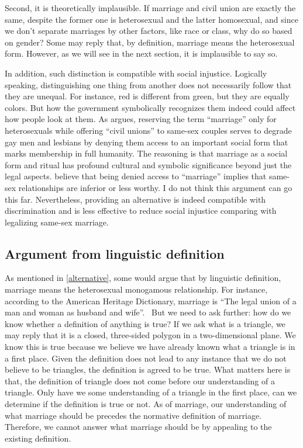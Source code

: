 \documentclass[man,floatsintext]{apa7}
\begin{document}
Second, it is theoretically implausible. If marriage and civil union are exactly the same, despite the former one is heterosexual and the latter homosexual, and since we don't separate marriages by other factors, like race or class, why do so based on gender? Some may reply that, by definition, marriage means the heterosexual form. However, as we will see in the next section, it is implausible to say so. 

In addition, such distinction is compatible with social injustice. Logically speaking, distinguishing one thing from another does not necessarily follow that they are unequal. For instance, red is different from green, but they are equally colors. But how the government symbolically recognizes them indeed could affect how people look at them. As \textcite{mohrLongArcJustice2007} argues, reserving the term ``marriage'' only for heterosexuals while offering ``civil unions'' to same-sex couples serves to degrade gay men and lesbians by denying them access to an important social form that marks membership in full humanity. The reasoning is that marriage as a social form and ritual has profound cultural and symbolic significance beyond just the legal aspects.  believe that being denied access to ``marriage'' implies that same-sex relationships are inferior or less worthy. I do not think this argument can go this far. Nevertheless, providing an alternative is indeed compatible with discrimination and is less effective to reduce social injustice comparing with legalizing same-sex marriage.


\subsection{Argument from linguistic definition}

As mentioned in \ref{alternative}, some would argue that by linguistic definition, marriage means the heterosexual monogamous relationship. For instance, according to the American Heritage Dictionary, marriage is ``The legal union of a man and woman as husband and wife''.~\autocite{pickertAmericanHeritageDictionary2000} But we need to ask further: how do we know whether a definition of anything is true? If we ask what is a triangle, we may reply that it is a closed, three-sided polygon in a two-dimensional plane. We know this is true because we believe we have already known what a triangle is in a first place. Given the definition does not lead to any instance that we do not believe to be triangles, the definition is agreed to be true. What matters here is that, the definition of triangle does not come before our understanding of a triangle. Only have we some understanding of a triangle in the first place, can we determine if the definition is true or not. As of marriage, our understanding of what marriage should be precedes the normative definition of marriage. Therefore, we cannot answer what marriage should be by appealing to the existing definition.
\end{document}
